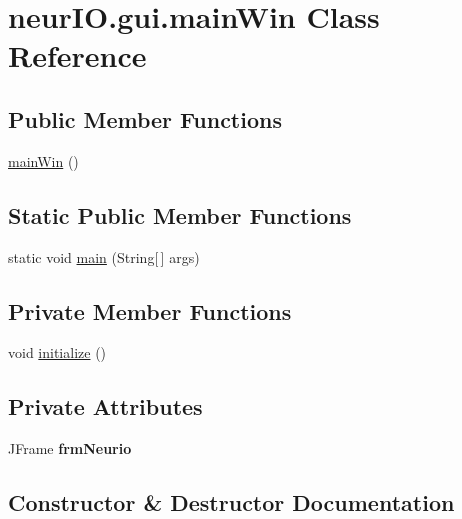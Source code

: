 \hypertarget{classneur_i_o_1_1gui_1_1main_win}{}\section{neur\+I\+O.\+gui.\+main\+Win Class Reference}
\label{classneur_i_o_1_1gui_1_1main_win}
\subsection*{Public Member Functions}
\begin{DoxyCompactItemize}
\item 
\hyperlink{classneur_i_o_1_1gui_1_1main_win_afea0b56eba10143502905975ceba7e25}{main\+Win} ()
\end{DoxyCompactItemize}
\subsection*{Static Public Member Functions}
\begin{DoxyCompactItemize}
\item 
static void \hyperlink{classneur_i_o_1_1gui_1_1main_win_a83d7ab4e35ec91fe149719b2c25cf834}{main} (String\mbox{[}$\,$\mbox{]} args)
\end{DoxyCompactItemize}
\subsection*{Private Member Functions}
\begin{DoxyCompactItemize}
\item 
void \hyperlink{classneur_i_o_1_1gui_1_1main_win_aab47900a0e64469a9b97c6270643ef14}{initialize} ()
\end{DoxyCompactItemize}
\subsection*{Private Attributes}
\begin{DoxyCompactItemize}
\item 
\mbox{\label{classneur_i_o_1_1gui_1_1main_win_ad9f1f617ba2e697a71d2817b0ed8d1fc}} 
J\+Frame {\bfseries frm\+Neurio}
\end{DoxyCompactItemize}


\subsection{Constructor \& Destructor Documentation}
\mbox{\label{classneur_i_o_1_1gui_1_1main_win_afea0b56eba10143502905975ceba7e25}} 
